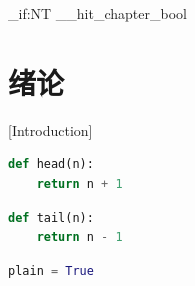 
\hitif[lang=en]{\bilingualswapon}{\bilingualswapoff}
\mainmatter
\ExplSyntaxOn
\bool_if:NT \g__hit_chapter_bool { \chapter{绪论}[Introduction] }
\ExplSyntaxOff
\begin{lstlisting}[language=Python, caption={{求渗透率}[Permeability]}]
def head(n):
    return n + 1
\end{lstlisting}
\begin{lstlisting}[language=Python, continued]
def tail(n):
    return n - 1
\end{lstlisting}
\begin{lstlisting}[language=Python]
plain = True
\end{lstlisting}

